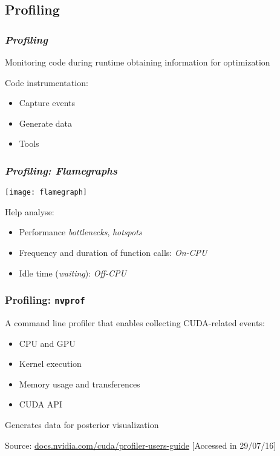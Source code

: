\documentclass[10pt, compress]{beamer}
\begin{document}
\subsection{Profiling}

\begin{frame}
    \frametitle{\textit{Profiling}}
    Monitoring code during \alert{runtime}
    obtaining information for \alert{optimization}


    Code \alert{instrumentation}:
    \begin{itemize}
        \item Capture \alert{events}

        \item Generate \alert{data}

        \item Tools
    \end{itemize}
\end{frame}

\begin{frame}
    \frametitle{\textit{Profiling: Flamegraphs}}
    \begin{center}
        \texttt{[image: flamegraph]}
    \end{center}

    Help analyse:
    \begin{itemize}
        \item Performance \textit{bottlenecks}, \textit{hotspots}

        \item Frequency and duration of \alert{function calls}: \textit{On-CPU}

        \item \alert{Idle} time (\textit{waiting}): \textit{Off-CPU}
    \end{itemize}
\end{frame}

\begin{frame}
    \frametitle{Profiling: \texttt{nvprof}}
    A \alert{command line} profiler
    that enables collecting CUDA-related events:

    \begin{itemize}
        \item CPU and GPU

        \item Kernel execution

        \item Memory usage and transferences

        \item CUDA API
    \end{itemize}


    Generates data for \alert{posterior visualization}

    \begin{center}
        \tiny{Source: \url{docs.nvidia.com/cuda/profiler-users-guide} [Accessed in 29/07/16]}
    \end{center}
\end{frame}
\end{document}
